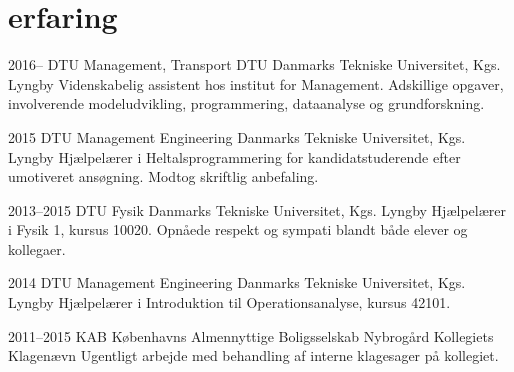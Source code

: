 \documentclass[]{../friggeri-cv} %
\begin{document}
\section{erfaring}
\begin{entrylist}
\entry
{2016--}
{DTU Management, Transport DTU}
{Danmarks Tekniske Universitet, Kgs. Lyngby}
{Videnskabelig assistent hos institut for Management. Adskillige opgaver, involverende modeludvikling, programmering, dataanalyse og grundforskning.}

\entry
{2015}
{DTU Management Engineering}
{Danmarks Tekniske Universitet, Kgs. Lyngby}
{Hjælpelærer i Heltalsprogrammering for kandidatstuderende efter umotiveret ansøgning. Modtog  skriftlig anbefaling.}

\entry
{2013--2015}
{DTU Fysik}
{Danmarks Tekniske Universitet, Kgs. Lyngby}
{Hjælpelærer i Fysik 1, kursus 10020. Opnåede  respekt og sympati blandt både elever og kollegaer.}

\entry
{2014}
{DTU Management Engineering}
{Danmarks Tekniske Universitet, Kgs. Lyngby}
{Hjælpelærer i Introduktion til Operationsanalyse, kursus 42101.}

\entry
{2011--2015}
{KAB {\normalfont Københavns Almennyttige Boligsselskab}}
{Nybrogård Kollegiets Klagenævn}
{Ugentligt arbejde med behandling af interne klagesager på kollegiet.
}
\end{entrylist}


\end{document}
